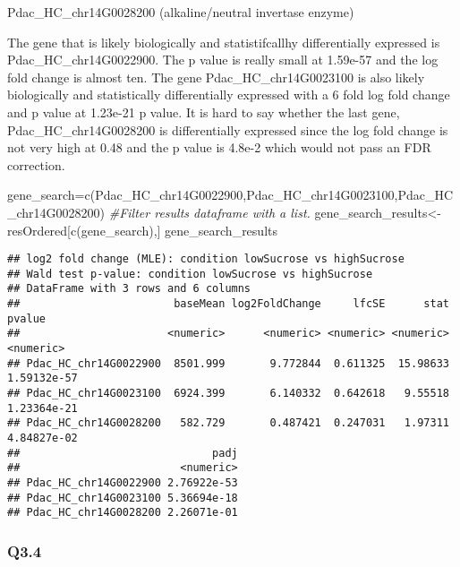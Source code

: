 \documentclass[
]{article}
\newenvironment{Shaded}{\begin{snugshade}}{\end{snugshade}}
\newcommand{\CommentTok}[1]{\textcolor[rgb]{0.56,0.35,0.01}{\textit{#1}}}
\newcommand{\FunctionTok}[1]{\textcolor[rgb]{0.00,0.00,0.00}{#1}}
\newcommand{\NormalTok}[1]{#1}
\newcommand{\OtherTok}[1]{\textcolor[rgb]{0.56,0.35,0.01}{#1}}
\newcommand{\StringTok}[1]{\textcolor[rgb]{0.31,0.60,0.02}{#1}}
\begin{document}
Pdac\_HC\_chr14G0028200 (alkaline/neutral invertase enzyme)

The gene that is likely biologically and statistifcallhy differentially
expressed is Pdac\_HC\_chr14G0022900. The p value is really small at
1.59e-57 and the log fold change is almost ten. The gene
Pdac\_HC\_chr14G0023100 is also likely biologically and statistically
differentially expressed with a 6 fold log fold change and p value at
1.23e-21 p value. It is hard to say whether the last gene,
Pdac\_HC\_chr14G0028200 is differentially expressed since the log fold
change is not very high at 0.48 and the p value is 4.8e-2 which would
not pass an FDR correction.

\begin{Shaded}
\begin{Highlighting}[]
\NormalTok{gene\_search}\OtherTok{=}\FunctionTok{c}\NormalTok{(}\StringTok{\textquotesingle{}Pdac\_HC\_chr14G0022900\textquotesingle{}}\NormalTok{,}\StringTok{\textquotesingle{}Pdac\_HC\_chr14G0023100\textquotesingle{}}\NormalTok{,}\StringTok{\textquotesingle{}Pdac\_HC\_chr14G0028200\textquotesingle{}}\NormalTok{)}
\CommentTok{\#Filter results dataframe with a list.}
\NormalTok{gene\_search\_results}\OtherTok{\textless{}{-}}\NormalTok{resOrdered[}\FunctionTok{c}\NormalTok{(gene\_search),]}
\NormalTok{gene\_search\_results}
\end{Highlighting}
\end{Shaded}

\begin{verbatim}
## log2 fold change (MLE): condition lowSucrose vs highSucrose 
## Wald test p-value: condition lowSucrose vs highSucrose 
## DataFrame with 3 rows and 6 columns
##                        baseMean log2FoldChange     lfcSE      stat      pvalue
##                       <numeric>      <numeric> <numeric> <numeric>   <numeric>
## Pdac_HC_chr14G0022900  8501.999       9.772844  0.611325  15.98633 1.59132e-57
## Pdac_HC_chr14G0023100  6924.399       6.140332  0.642618   9.55518 1.23364e-21
## Pdac_HC_chr14G0028200   582.729       0.487421  0.247031   1.97311 4.84827e-02
##                              padj
##                         <numeric>
## Pdac_HC_chr14G0022900 2.76922e-53
## Pdac_HC_chr14G0023100 5.36694e-18
## Pdac_HC_chr14G0028200 2.26071e-01
\end{verbatim}

\hypertarget{q3.4}{%
\subsubsection{Q3.4}\label{q3.4}}
\end{document}
